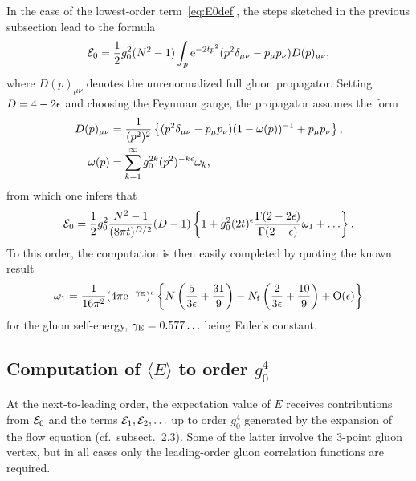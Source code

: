 In the case of the lowest-order term~\eqref{eq:E0def},
the steps sketched in the previous subsection
lead to the formula
\begin{equation}
  {\cal E}_0=\frac{1}{2}g_0^2(N^2-1)
  \int_p\mathrm{e}^{-2tp^2}
  (p^2\delta_{\mu\nu}-p_{\mu}p_{\nu})
  D(p)_{\mu\nu},
  \label{eq:E0int}
\end{equation}
where $D(p)_{\mu\nu}$ denotes the unrenormalized full gluon propagator.
Setting $D=4-2\epsilon$ and choosing the Feynman gauge,
the propagator assumes the form
\begin{align}
  D(p)_{\mu\nu}&={1\over(p^2)^2}\left\{
  (p^2\delta_{\mu\nu}-p_{\mu}p_{\nu})(1-\omega(p))^{-1}+p_{\mu}p_{\nu}
  \right\},
  \\
  \omega(p)&=\sum_{k=1}^{\infty}g_0^{2k}(p^2)^{-k\epsilon}\omega_k,
\end{align}
from which one infers that
\begin{equation}
  {\cal E}_0=\frac{1}{2}g_0^2{N^2-1\over(8\pi t)^{D/2}}(D-1)
  \left\{1+g_0^2(2t)^{\epsilon}{\Gamma(2-2\epsilon)\over\Gamma(2-\epsilon)}\omega_1
  +\ldots\right\}.
  \label{eq:E0res}
\end{equation}
To this order, the computation is then easily completed by
quoting the known result
\begin{equation}
  \omega_1={1\over 16\pi^2}(4\pi\mathrm{e}^{-\gamma_{\mathrm{E}}})^{\epsilon}
  \left\{N\left(\frac{5}{3\epsilon}+\frac{31}{9}\right)
  -N_{\mathrm{f}}\left(\frac{2}{3\epsilon}+\frac{10}{9}\right)
  +\mathrm{O}(\epsilon)\right\}
  \label{eq:omega1}
\end{equation}
for the gluon self-energy, $\gamma_{\mathrm{E}}=0.577\ldots$ being
Euler's constant.


\subsection{Computation of $\langle E\rangle$ to order $g_0^4$}

At the next-to-leading order, the expectation value of $E$
receives contributions
from ${\cal E}_0$ and the terms
${\cal E}_1,{\cal E}_2,\ldots$
up to order $g_0^4$
generated by the expansion of
the flow equation
(cf.~subsect.~2.3). Some of the latter involve
the $3$-point gluon vertex, but in all cases only the
leading-order gluon correlation functions are required.

